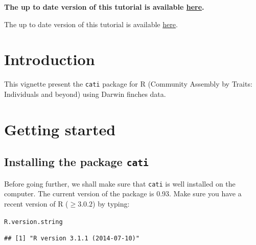 \documentclass[12pt]{article}\usepackage[]{graphicx}\usepackage[]{color}
\makeatletter
\newcommand{\hlstd}[1]{\textcolor[rgb]{0.345,0.345,0.345}{#1}}%
\newenvironment{kframe}{%
 \def\at@end@of@kframe{}%
 \ifinner\ifhmode%
  \def\at@end@of@kframe{\end{minipage}}%
  \begin{minipage}{\columnwidth}%
 \fi\fi%
 \def\FrameCommand##1{\hskip\@totalleftmargin \hskip-\fboxsep
 \colorbox{shadecolor}{##1}\hskip-\fboxsep
     \hskip-\linewidth \hskip-\@totalleftmargin \hskip\columnwidth}%
 \MakeFramed {\advance\hsize-\width
   \@totalleftmargin\z@ \linewidth\hsize
   \@setminipage}}%
 {\par\unskip\endMakeFramed%
 \at@end@of@kframe}
\newenvironment{knitrout}{}{} %
\makeatother
\begin{document}
\vfill
\begin{center}
\textbf{The up to date version of this tutorial is available \href{http://sourceforge.net/p/cati-r/code/ci/master/tree/tutorial/vignettes/vignette.pdf}{here}.}
\end{center}

\hfill
The up to date version of this tutorial is available \href{http://sourceforge.net/p/cati-r/code/ci/master/tree/tutorial/vignettes/vignette.pdf}{here}.


\newpage
\tableofcontents

\newpage


\section{Introduction}
This vignette present the \texttt{cati} package for R (Community Assembly by Traits: Individuals and beyond) using Darwin finches data.

\section{Getting started}
\subsection{Installing the package \texttt{cati}}

Before going further, we shall make sure that \texttt{cati} is well installed
on the computer.
The current version of the package is 0.93.
Make sure you have a recent version of R ($\geq 3.0.2$) by typing:

\begin{knitrout}
\color{fgcolor}\begin{kframe}
\begin{alltt}
\hlstd{R.version.string}
\end{alltt}
\begin{verbatim}
## [1] "R version 3.1.1 (2014-07-10)"
\end{verbatim}
\end{kframe}
\end{knitrout}
\end{document}
